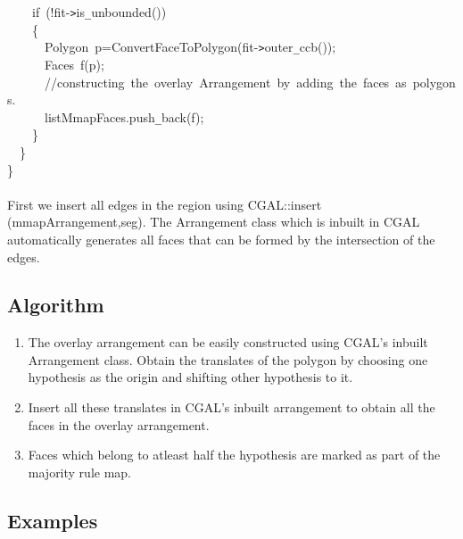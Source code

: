 {\jttstylea ~~~~\jttstylee if~\jttstylei (\jttstylek !fit-\verb#>#is\verb#_#unbounded\jttstylei ())\\
\jttstylea ~~~~\jttstylei \{\\
\jttstylea ~~~~~~\jttstylek Polygon~p=ConvertFaceToPolygon\jttstylei (\jttstylek fit-\verb#>#outer\verb#_#ccb\jttstylei ())\jttstylek ;\\
\jttstylea ~~~~~~\jttstylek Faces~f\jttstylei (\jttstylek p\jttstylei )\jttstylek ;\\
\jttstylea ~~~~~~\jttstyled //constructing~the~overlay~Arrangement~by~adding~the~faces~as~polygons.\\
\jttstylea ~~~~~~\jttstylek listMmapFaces.push\verb#_#back\jttstylei (\jttstylek f\jttstylei )\jttstylek ;\\
\jttstylea ~~~~\jttstylei \}\\
\jttstylea ~~\jttstylei \}\\
\jttstylei \}\\
\jttstylea \jttstylea 
\\

}
First we insert all edges in the region using CGAL::insert (mmapArrangement,seg). The Arrangement class which is inbuilt in CGAL 
automatically generates all faces that can be formed by the intersection of the edges.





\subsection{Algorithm}
\begin{enumerate}
\item
The overlay arrangement can be easily constructed using CGAL's inbuilt Arrangement class. Obtain the translates of the polygon by 
choosing one hypothesis as the origin and shifting other hypothesis to it.
\item
Insert all these translates in CGAL's inbuilt arrangement to obtain all the faces in the overlay arrangement.
\item
Faces which belong to atleast half the hypothesis are marked as part of the majority rule map.
\end{enumerate}


\subsection{Examples}



